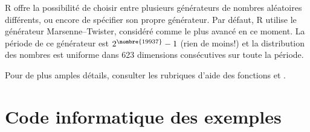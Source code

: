 R offre la possibilité de choisir entre plusieurs générateurs de
nombres aléatoires différents, ou encore de spécifier son propre
générateur. Par défaut, R utilise le générateur Marsenne--Twister,
considéré comme le plus avancé en ce moment. La période de ce
générateur est $2^{\nombre{19937}} - 1$ (rien de moins!) et la
distribution des nombres est uniforme dans 623 dimensions consécutives
sur toute la période.

Pour de plus amples détails, consulter les rubriques d'aide des
fonctions  et .


\section{Code informatique des exemples}
\label{sec:generation:code}





